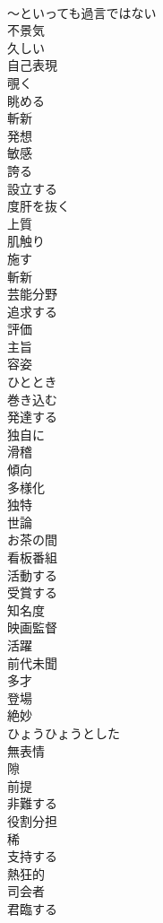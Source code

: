 \documentclass[8pt]{extreport}
\begin{document}
\begin{CJK}{UTF8}{min}
\\	～といっても過言ではない
\\	不景気
\\	久しい
\\	自己表現
\\	覗く
\\	眺める
\\	斬新
\\	発想
\\	敏感
\\	誇る
\\	設立する
\\	度肝を抜く
\\	上質
\\	肌触り
\\	施す
\\	斬新
\\	芸能分野
\\	追求する
\\	評価
\\	主旨
\\	容姿
\\	ひととき
\\	巻き込む
\\	発達する
\\	独自に
\\	滑稽
\\	傾向
\\	多様化
\\	独特
\\	世論
\\	お茶の間
\\	看板番組
\\	活動する
\\	受賞する
\\	知名度
\\	映画監督
\\	活躍
\\	前代未聞
\\	多才
\\	登場
\\	絶妙
\\	ひょうひょうとした
\\	無表情
\\	隙
\\	前提
\\	非難する
\\	役割分担
\\	稀
\\	支持する
\\	熱狂的
\\	司会者
\\	君臨する

\end{CJK}
\end{document}
